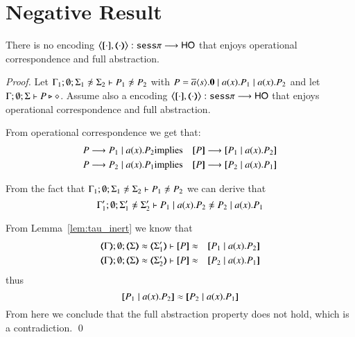 \section{Negative Result}
\label{app:neg}

\begin{theorem}\rm
	There is no encoding $\enc{\cdot}{\cdot}: \sesp \longrightarrow \HO$
	that enjoys operational correspondence and full abstraction.
\end{theorem}

\begin{proof}
	Let $\Gamma_1; \emptyset; \Sigma_1 \not\wb \Sigma_2 \proves P_1 \not\wb P_2 $
	with $P = \overline{a} \langle s \rangle . \mathbf{0} \;|\; a (x) . P_1 \;|\; a (x) . P_2$ and
	let $\Gamma; \emptyset; \Sigma \vdash P \triangleright \diamond$.
	Assume also a encoding
	$\enc{\cdot}{\cdot}: \sesp \longrightarrow \HO$
	that enjoys
	operational correspondence and full abstraction.

	From operational correspondence we get that:
	\begin{eqnarray*}
		P \red P_1 \Par \bacc{a}{x} P_2 &\textrm{implies}& \map{P} \red \map{P_1 \Par \bacc{a}{x} P_2}\\
		P \red P_2 \Par \bacc{a}{x} P_1 &\textrm{implies}& \map{P} \red \map{P_2 \Par \bacc{a}{x} P_1}
	\end{eqnarray*}

	From the fact that
	$\Gamma_1; \emptyset; \Sigma_1 \not\wb \Sigma_2 \proves P_1 \not\wb P_2$
	we can derive that
	\[
		\Gamma_1'; \emptyset; \Sigma_1' \not\wb \Sigma_2' \proves P_1 \Par \bacc{a}{x} P_2 \not\wb P_2 \Par \bacc{a}{x} P_1
	\]

	From Lemma~\ref{lem:tau_inert} we know that
	\begin{eqnarray*}
		\mapt{\Gamma}; \emptyset; \mapt{\Sigma} \wb \mapt{\Sigma_1'} \proves \map{P} &\wb& \map{P_1 \Par \bacc{a}{x} P_2}\\
		\mapt{\Gamma}; \emptyset; \mapt{\Sigma} \wb \mapt{\Sigma_2'} \proves \map{P} &\wb& \map{P_2 \Par \bacc{a}{x} P_1}
	\end{eqnarray*}
	\noi thus
	\[
		\map{P_1 \Par \bacc{a}{x} P_2} \wb \map{P_2 \Par \bacc{a}{x} P_1}
	\]
	From here we conclude that the full abstraction property does not hold,
	which is a contradiction.
	\qed
\end{proof}
